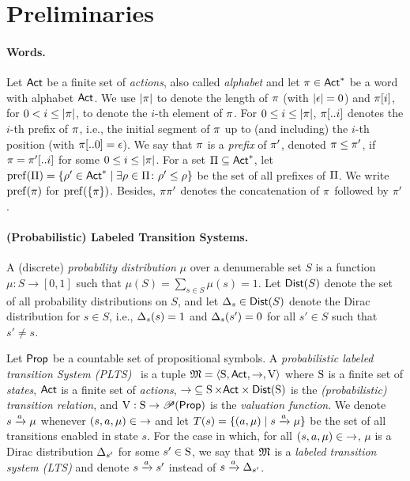 \section{Preliminaries}
\label{sec:preliminaries}



\paragraph{Words.} Let $\Act$ be a finite set of \emph{actions}, also called
\emph{alphabet} and let $\plan\in\Act^*$ be a word with alphabet
$\Act$.  We use $\size{\plan}$ to denote the length of $\plan$ (with
$\size{\epsilon}=0$) and $\plan[i]$, for $0<i\leq\size{\plan}$,
to denote the $i$-th element of $\plan$.
%
For $0\leq i\leq\size{\plan}$, $\plan[..i]$ denotes the $i$-th prefix
of $\plan$, i.e., the initial segment of $\plan$ up to (and including)
the $i$-th position (with $\plan[..0] = \epsilon$).
%
We say that $\plan$ is a \emph{prefix} of $\plan'$, denoted
$\plan\leq\plan'$, if $\plan=\plan'[..i]$ for some $0\leq
i\leq\size{\plan}$.  For a set $\plans\subseteq\Act^*$, let
$\pref(\plans)=\{\rho'\in\Act^*\mid{\exists{\rho\in\plans}\colon{\rho'\leq\rho}}\}$
be the set of all prefixes of $\plans$.  %
We write $\pref(\plan)$ for $\pref(\{\plan\})$.
%
Besides, $\plan\plan'$ denotes the concatenation of $\plan$ followed by
$\plan'$.


\paragraph{(Probabilistic) Labeled Transition Systems.} 
A (discrete) \emph{probability distribution} $\mu$ over a denumerable
set $S$ is a function $\mu: S \rightarrow [0, 1] $ such that
$\mu(S) = \sum_{s \in S} \mu(s) = 1$.  Let $\Dist(S)$ denote the set
of all probability distributions on $S$, and let $\Dirac_s \in \Dist(S)$
denote the Dirac distribution for $s \in S$, i.e., $\Dirac_s(s) =1$
and $\Dirac_s(s') = 0$ for all $s' \in S$ such that $s'\neq s$.



Let $\Prop$ be a countable set of propositional symbols.
%
A \emph{probabilistic labeled transition System
(PLTS)}~\cite{Segala95} is a tuple $\model=\tup{\S,\Act,\ra,\V}$ where
$\S$ is a finite set of \emph{states}, $\Act$ is a finite set of
\emph{actions}, ${\ra}\subseteq {\S \times \Act \times \Dist(\S)}$ is
the \emph{(probabilistic) transition relation}, and
$\V:\S\to\powerset(\Prop)$ is the \emph{valuation function}.
%
We denote $s\reach{a}\mu$ whenever $(s,a,\mu)\in{\ra}$ and let
$T(s)=\{(a,\mu)\mid {s\reach{a}\mu}\}$ be the set of all transitions
enabled in state $s$.
%
For the case in which, for all $(s,a,\mu)\in{\ra}$, $\mu$ is a Dirac
distribution $\Dirac_{s'}$ for some $s'\in\S$, we say that $\model$ is
a \emph{labeled transition system (LTS)} and denote $s\reach{a}s'$
instead of $s\reach{a}\Dirac_{s'}$.

